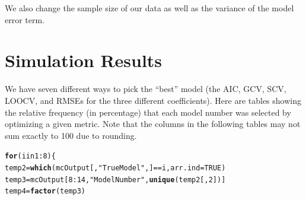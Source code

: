 \documentclass{article}\usepackage{graphicx, color}
\makeatletter
\newcommand{\hlfunctioncall}[1]{\textcolor[rgb]{0.501960784313725,0,0.329411764705882}{\textbf{#1}}}%
\newcommand{\hlstring}[1]{\textcolor[rgb]{0.6,0.6,1}{#1}}%
\newenvironment{kframe}{%
 \def\at@end@of@kframe{}%
 \ifinner\ifhmode%
  \def\at@end@of@kframe{\end{minipage}}%
  \begin{minipage}{\columnwidth}%
 \fi\fi%
 \def\FrameCommand##1{\hskip\@totalleftmargin \hskip-\fboxsep
 \colorbox{shadecolor}{##1}\hskip-\fboxsep
     \hskip-\linewidth \hskip-\@totalleftmargin \hskip\columnwidth}%
 \MakeFramed {\advance\hsize-\width
   \@totalleftmargin\z@ \linewidth\hsize
   \@setminipage}}%
 {\par\unskip\endMakeFramed%
 \at@end@of@kframe}
\newenvironment{knitrout}{}{} %
\makeatother
\begin{document}
We also change the sample size of our data as well as the variance of the model error term.

\section{Simulation Results}

We have seven different ways to pick the ``best'' model (the AIC, GCV, SCV, LOOCV, and RMSEs for the three different coefficients). Here are tables showing the relative frequency (in percentage) that each model number was selected by optimizing a given metric. Note that the columns in the following tables may not sum exactly to 100 due to rounding.




\begin{knitrout}
\color{fgcolor}\begin{kframe}
\begin{alltt}
\hlfunctioncall{for} (i in 1:8) \{
    temp2 = \hlfunctioncall{which}(mcOutput[, \hlstring{"True Model"}, ] == i, arr.ind = TRUE)
    temp3 = mcOutput[8:14, \hlstring{"Model Number"}, \hlfunctioncall{unique}(temp2[, 2])]
    temp4 = \hlfunctioncall{factor}(temp3)
    

\end{alltt}
\end{kframe}
\end{knitrout}
\end{document}
